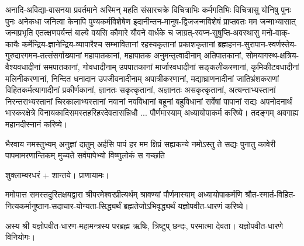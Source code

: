 अनादि-अविद्या-वासनया प्रवर्तमाने अस्मिन् महति संसारचक्रे विचित्राभिः
कर्मगतिभिः विचित्रासु योनिषु पुनः पुनः अनेकधा जनित्वा केनापि पुण्यकर्मविशेषेण
इदानीन्तन-मानुष-द्विजजन्मविशेषं प्राप्त\-वतः मम जन्माभ्यासात् जन्मप्रभृति एतत्क्षण\-पर्यन्तं बाल्ये वयसि
कौमारे यौवने वार्धके च जाग्रत्-स्वप्न-सुषुप्ति-अवस्थासु मनो-वाक्-कायैः
कर्मेन्द्रिय-ज्ञानेन्द्रिय-व्यापारैश्च सम्भावितानां रहस्यकृतानां प्रकाशकृतानां ब्रह्महनन-सुरापान-स्वर्णस्तेय-गुरुदारगमन-तत्संसर्गाख्यानां महा\-पातकानां, महापातक अनुमन्तृत्वादीनाम् अति\-पातकानां,
सोमयागस्थ-क्षत्रिय-वैश्य\-वधादीनां सम\-पातकानां, गो\-वधादीनाम् उप\-पातकानां मार्जार\-वधादीनां सङ्कली\-करणानां,
कृमिकीट\-वधादीनां मलिनी\-करणानां, निन्दित धनादान उपजीवनादीनाम् अपात्री\-करणानां, मद्याघ्राणनादीनां जातिभ्रंशकराणां विहितकर्मत्यागादीनां
प्रकीर्णकानां, ज्ञानतः सकृत्कृतानां, अज्ञानतः असकृत्कृतानां, अत्यन्ताभ्यस्तानां निरन्तरा\-भ्यस्तानां
चिरकालाभ्यस्तानां नवानां नवविधानां बहूनां बहुविधानां सर्वेषां पापानां सद्यः अपनोदनार्थं
भास्कर\-क्षेत्रे  विनायकादि\-समस्त\-हरिहर\-देवतासन्निधौ ... पौर्णमास्याम् अध्यायोपा\-कर्म करिष्ये।  तदङ्गम्
अवगाह्य महानदीस्नानं करिष्ये।\\

{भैरवाय नमस्तुभ्यम् अनुज्ञां दातुम् अर्हसि}%
{पापं हर मम क्षिप्रं सह्यकन्ये नमोऽस्तु ते}%
{सद्यः पुनातु कावेरी पापमामरणान्तिकम्}%
{मुच्यते सर्वपापेभ्यो विष्णुलोकं स गच्छति}%




शुक्लाम्बरधरं + शान्तये। प्राणायामः।

ममोपात्त समस्तदुरितक्षयद्वारा श्रीपरमेश्वरप्रीत्यर्थम् श्रावण्यां पौर्णमास्याम् अध्यायोपाकर्मणि 
श्रौत-स्मार्त-विहित-नित्यकर्मानुष्ठान-सदाचार-योग्यता-सिद्ध्यर्थं
ब्रह्मतेजो\-ऽभि\-वृद्ध्यर्थं यज्ञोपवीत-धारणं करिष्ये।

अस्य श्री यज्ञोपवीत-धारण-महामन्त्रस्य परब्रह्म ऋषिः, त्रिष्टुप् छन्दः, परमात्मा देवता।
यज्ञोपवीत-धारणे विनियोगः।

